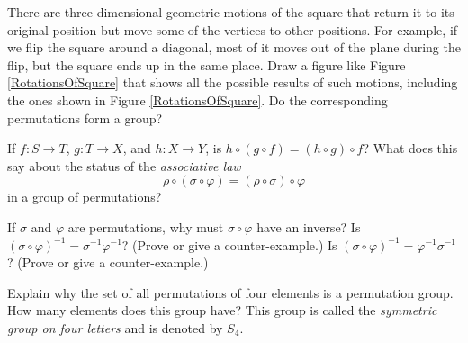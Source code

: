 \iteme There are three dimensional geometric motions of the square that
return it to its original position but move some of the vertices to other
positions. For example, if we flip the square around a diagonal, most of it moves out of
the plane during the flip, but  the square ends up in the same place.  Draw a figure
like Figure
\ref{RotationsOfSquare} that shows all the possible results of such motions, including
the ones shown in Figure \ref{RotationsOfSquare}.  Do the corresponding permutations
form a group?\label{dihedral1}

\iteme If $f:S\rightarrow T$, $g:T\rightarrow X$, and
$h:X \rightarrow Y$, is $h\circ(g\circ f) = (h\circ g)\circ f$? 
What does this say about the status of the {\em associative
law}
$$\rho\circ(\sigma\circ \varphi) = (\rho\circ \sigma)\circ\varphi$$ in a
group of permutations?

\itemei If $\sigma$ and $\varphi$ are permutations, why must
$\sigma\circ\varphi$ have an inverse?  Is $(\sigma\circ\varphi)^{-1}=
\sigma^{-1}\varphi^{-1}$?  (Prove or give a counter-example.)  Is 
$(\sigma\circ\varphi)^{-1}=
\varphi^{-1}\sigma^{-1}$? (Prove or give a counter-example.)

\iteme Explain why the set of all permutations of four elements is a
permutation group.  How many elements does this group have?  This group
is called the {\em symmetric group on four letters} and is denoted by $S_4$. 
\ep

